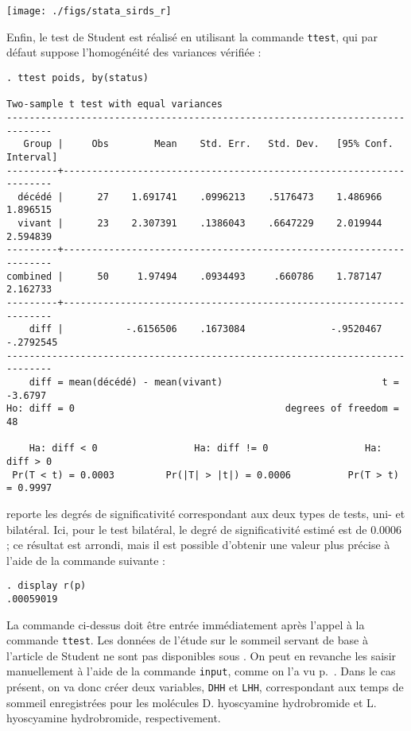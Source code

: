 \texttt{[image: ./figs/stata\_sirds\_r]}

Enfin, le test de Student est réalisé en utilisant la commande
\texttt{ttest}, qui par défaut suppose l'homogénéité des variances vérifiée :
\begin{verbatim}
. ttest poids, by(status)

Two-sample t test with equal variances
------------------------------------------------------------------------------
   Group |     Obs        Mean    Std. Err.   Std. Dev.   [95% Conf. Interval]
---------+--------------------------------------------------------------------
  décédé |      27    1.691741    .0996213    .5176473    1.486966    1.896515
  vivant |      23    2.307391    .1386043    .6647229    2.019944    2.594839
---------+--------------------------------------------------------------------
combined |      50     1.97494    .0934493     .660786    1.787147    2.162733
---------+--------------------------------------------------------------------
    diff |           -.6156506    .1673084               -.9520467   -.2792545
------------------------------------------------------------------------------
    diff = mean(décédé) - mean(vivant)                            t =  -3.6797
Ho: diff = 0                                     degrees of freedom =       48

    Ha: diff < 0                 Ha: diff != 0                 Ha: diff > 0
 Pr(T < t) = 0.0003         Pr(|T| > |t|) = 0.0006          Pr(T > t) = 0.9997
\end{verbatim}
\Stata reporte les degrés de significativité correspondant aux deux types de
tests, uni- et bilatéral. Ici, pour le test bilatéral, le degré de
significativité estimé est de 0.0006 ; ce résultat est arrondi, mais il est
possible d'obtenir une valeur plus précise à l'aide de la commande suivante :
\begin{verbatim}
. display r(p)
.00059019
\end{verbatim}
La commande ci-dessus doit être entrée immédiatement après l'appel à la
commande \verb|ttest|.
%
%
%
\soln{\ref{exo:9.2}} Les données de l'étude sur le sommeil servant de base à
l'article de Student ne sont pas disponibles sous \Stata. On peut en revanche
les saisir manuellement à l'aide de la commande \verb|input|, comme on l'a
vu p.~\pageref{para:edit}. Dans le cas présent, on va donc créer deux
variables, \texttt{DHH} et \texttt{LHH}, correspondant aux temps de sommeil
enregistrées pour les molécules D. hyoscyamine hydrobromide et
L. hyoscyamine hydrobromide, respectivement. 
